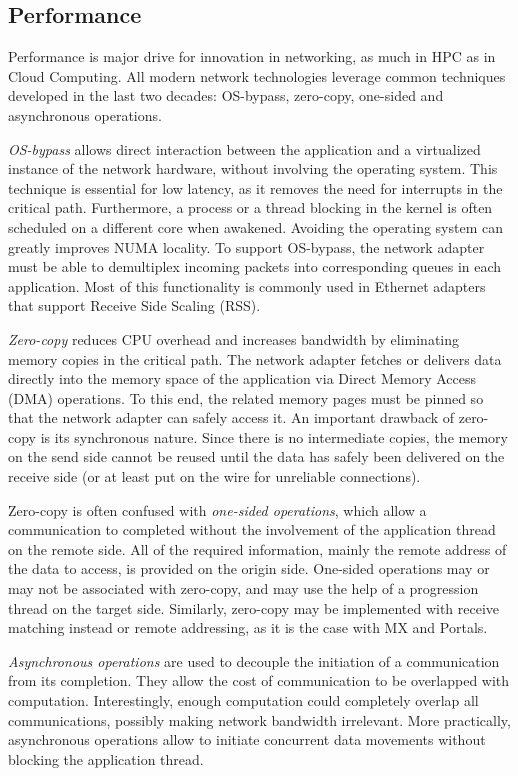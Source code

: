 \documentclass[conference]{IEEEtran}
\begin{document}
\subsection{Performance}
Performance is major drive for innovation in networking, as much in HPC as 
in Cloud Computing. All modern network technologies leverage common techniques 
developed in the last two decades: OS-bypass, zero-copy, one-sided and asynchronous operations.

\emph{OS-bypass} allows direct interaction between the application and 
a virtualized instance of the network hardware, without involving the 
operating system. 
This technique is essential for low latency, as it removes the need for 
interrupts in the critical path. Furthermore, a process or a thread blocking 
in the kernel is often scheduled on a different core when awakened. Avoiding the 
operating system can greatly improves NUMA locality. 
To support OS-bypass, the network adapter must be able to demultiplex incoming 
packets into corresponding queues in each application. Most of this 
functionality is commonly used in Ethernet adapters that support Receive Side 
Scaling (RSS).

\emph{Zero-copy} reduces CPU overhead and increases bandwidth by eliminating 
memory copies in the critical path. The network adapter fetches or delivers 
data directly into the memory space of the application via Direct Memory Access 
(DMA) operations. To this end, the related memory pages must be pinned so 
that the network adapter can safely access it. 
An important drawback of zero-copy is its synchronous nature. Since there is 
no intermediate copies, the memory on the send side cannot be reused until 
the data has safely been delivered on the receive side (or at least put on 
the wire for unreliable connections).

Zero-copy is often confused with \emph{one-sided operations}, which allow a 
communication to completed without the involvement of the application thread 
on the remote side. All of the required information, mainly the remote address 
of the data to access, is provided on the origin side. One-sided operations 
may or may not be associated with zero-copy, and may use the help of a 
progression thread on the target side. Similarly, zero-copy may be implemented 
with receive matching instead or remote addressing, as it is the case with MX 
and Portals.

\emph{Asynchronous operations} are used to decouple the initiation of a 
communication from its completion. They allow the cost of communication to be 
overlapped with computation. Interestingly, enough computation could completely 
overlap all communications, possibly making network bandwidth irrelevant. 
More practically, asynchronous operations allow to initiate concurrent 
data movements without blocking the application thread.
\end{document}
